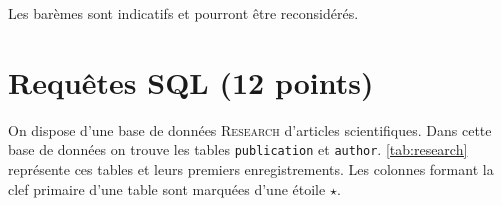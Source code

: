 

    Les barèmes sont indicatifs et pourront être reconsidérés.

    \section*{Requêtes SQL (12 points)}

    On dispose d'une base de données \textsc{Research} d'articles scientifiques. Dans cette base de données on trouve les tables \texttt{publication} et \texttt{author}. \autoref{tab:research} représente ces tables et leurs premiers enregistrements. Les colonnes formant la clef primaire d'une table sont marquées d'une étoile $ \star $.

